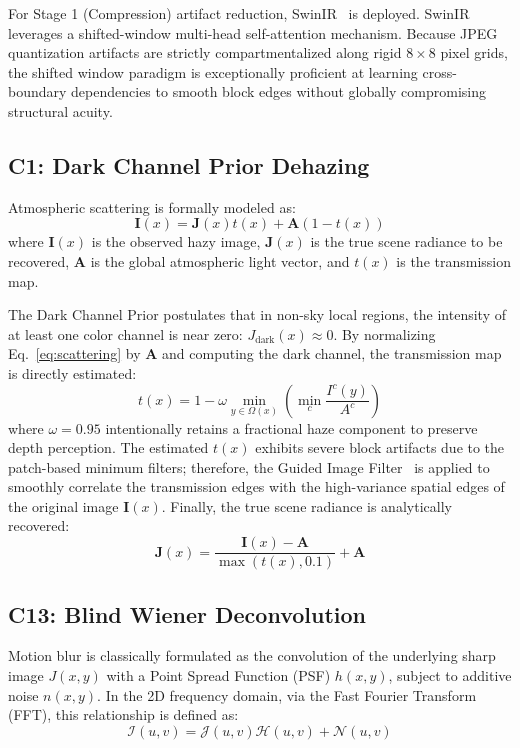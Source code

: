 \documentclass[journal, 10pt]{IEEEtran}
\begin{document}
For Stage 1 (Compression) artifact reduction, SwinIR~\cite{liang2021swinir} is deployed. SwinIR leverages a shifted-window multi-head self-attention mechanism. Because JPEG quantization artifacts are strictly compartmentalized along rigid $8\times8$ pixel grids, the shifted window paradigm is exceptionally proficient at learning cross-boundary dependencies to smooth block edges without globally compromising structural acuity.

\subsection{C1: Dark Channel Prior Dehazing}
Atmospheric scattering is formally modeled as:
\begin{equation} \label{eq:scattering}
    \mathbf{I}(x) = \mathbf{J}(x)t(x) + \mathbf{A}(1 - t(x))
\end{equation}
where $\mathbf{I}(x)$ is the observed hazy image, $\mathbf{J}(x)$ is the true scene radiance to be recovered, $\mathbf{A}$ is the global atmospheric light vector, and $t(x)$ is the transmission map.

The Dark Channel Prior postulates that in non-sky local regions, the intensity of at least one color channel is near zero: $J_{\text{dark}}(x) \approx 0$. By normalizing Eq.~\ref{eq:scattering} by $\mathbf{A}$ and computing the dark channel, the transmission map is directly estimated:
\begin{equation} \label{eq:transmission}
    t(x) = 1 - \omega \min_{y \in \Omega(x)} \left( \min_c \frac{I^c(y)}{A^c} \right)
\end{equation}
where $\omega = 0.95$ intentionally retains a fractional haze component to preserve depth perception. The estimated $t(x)$ exhibits severe block artifacts due to the patch-based minimum filters; therefore, the Guided Image Filter~\cite{he2013guided} is applied to smoothly correlate the transmission edges with the high-variance spatial edges of the original image $\mathbf{I}(x)$. Finally, the true scene radiance is analytically recovered:
\begin{equation} \label{eq:radiance_recovery}
    \mathbf{J}(x) = \frac{\mathbf{I}(x) - \mathbf{A}}{\max(t(x), 0.1)} + \mathbf{A}
\end{equation}

\subsection{C13: Blind Wiener Deconvolution}
Motion blur is classically formulated as the convolution of the underlying sharp image $J(x,y)$ with a Point Spread Function (PSF) $h(x,y)$, subject to additive noise $n(x,y)$. In the 2D frequency domain, via the Fast Fourier Transform (FFT), this relationship is defined as:
\begin{equation} \label{eq:freq_conv}
    \mathcal{I}(u,v) = \mathcal{J}(u,v)\mathcal{H}(u,v) + \mathcal{N}(u,v)
\end{equation}
\end{document}
